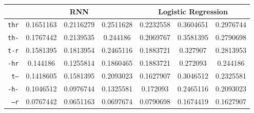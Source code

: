 \documentclass[../main.tex]{subfiles}
\begin{document}
\begin{table}[ht]
\begin{small}
\begin{tabular}{|r|c|c|c|c|c|c|}
		\hline
		 & \multicolumn{3}{|c|}{\textbf{RNN}} & \multicolumn{3}{|c|}{\textbf{Logistic Regression}} \\
		\hline
		\texttt{thr} & 0.1651163 & 0.2116279 & 0.2511628 & 0.2232558 & 0.3604651 & 0.2976744 \\
		\texttt{th-} & 0.1767442 & 0.2139535 & 0.244186 & 0.2069767 & 0.3581395 & 0.2790698 \\
		\texttt{t-r} & 0.1581395 & 0.1813954 & 0.2465116 & 0.1883721 & 0.327907 & 0.2813953 \\
		\texttt{-hr} & 0.144186 & 0.1255814 & 0.1860465 & 0.1883721 & 0.272093 & 0.244186 \\
		\texttt{t--} & 0.1418605 & 0.1581395 & 0.2093023 & 0.1627907 & 0.3046512 & 0.2325581 \\
		\texttt{-h-} & 0.1046512 & 0.0976744 & 0.1325581 & 0.172093 & 0.2465116 & 0.2093023 \\
		\texttt{--r} & 0.0767442 & 0.0651163 & 0.0697674 & 0.0790698 & 0.1674419 & 0.1627907 \\
		\hline
	\end{tabular}
	\end{small}
\end{table}
\end{document}
